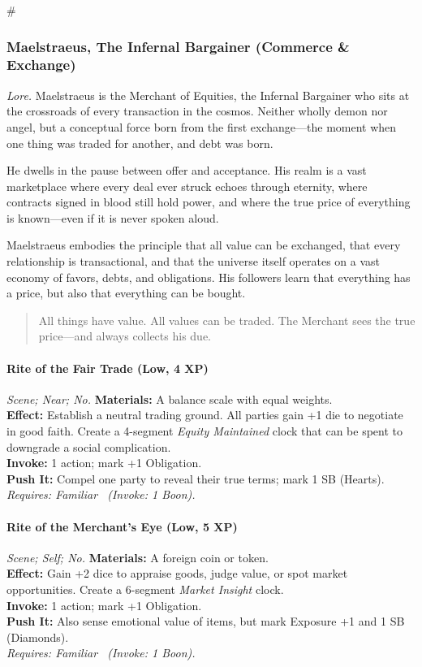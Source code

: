 # %

\subsubsection{Maelstraeus, The Infernal Bargainer (Commerce \& Exchange)}
\textit{Lore.} Maelstraeus is the Merchant of Equities, the Infernal Bargainer who sits at the crossroads of every transaction in the cosmos. Neither wholly demon nor angel, but a conceptual force born from the first exchange—the moment when one thing was traded for another, and debt was born.

He dwells in the pause between offer and acceptance. His realm is a vast marketplace where every deal ever struck echoes through eternity, where contracts signed in blood still hold power, and where the true price of everything is known—even if it is never spoken aloud.

Maelstraeus embodies the principle that all value can be exchanged, that every relationship is transactional, and that the universe itself operates on a vast economy of favors, debts, and obligations. His followers learn that everything has a price, but also that everything can be bought.

\begin{quote}
All things have value. All values can be traded. The Merchant sees the true price—and always collects his due.
\end{quote}

\paragraph*{Rite of the Fair Trade (Low, 4 XP)} \emph{Scene; Near; No.}
\textbf{Materials:} A balance scale with equal weights.\\
\textbf{Effect:} Establish a neutral trading ground. All parties gain +1 die to negotiate in good faith. Create a 4-segment \emph{Equity Maintained} clock that can be spent to downgrade a social complication.\\
\textbf{Invoke:} 1 action; mark +1 Obligation.\\
\textbf{Push It:} Compel one party to reveal their true terms; mark 1 SB (Hearts).\\
\emph{Requires: Familiar \ (\textit{Invoke:} 1 Boon).}

\paragraph*{Rite of the Merchant's Eye (Low, 5 XP)} \emph{Scene; Self; No.}
\textbf{Materials:} A foreign coin or token.\\
\textbf{Effect:} Gain +2 dice to appraise goods, judge value, or spot market opportunities. Create a 6-segment \emph{Market Insight} clock.\\
\textbf{Invoke:} 1 action; mark +1 Obligation.\\
\textbf{Push It:} Also sense emotional value of items, but mark Exposure +1 and 1 SB (Diamonds).\\
\emph{Requires: Familiar \ (\textit{Invoke:} 1 Boon).}

